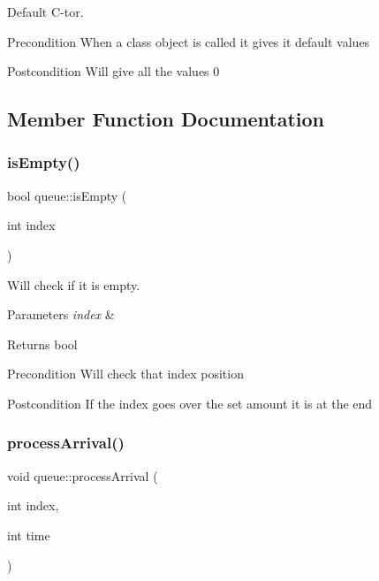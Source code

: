 Default C-\/tor. 

\begin{DoxyPrecond}{Precondition}
When a class object is called it gives it default values 
\end{DoxyPrecond}
\begin{DoxyPostcond}{Postcondition}
Will give all the values 0 
\end{DoxyPostcond}


\subsection{Member Function Documentation}
\mbox{\label{classqueue_a3e8602b62836e36122d074c52a09b1d1}} 
\subsubsection{\texorpdfstring{is\+Empty()}{isEmpty()}}
{\footnotesize\ttfamily bool queue\+::is\+Empty (\begin{DoxyParamCaption}\item[{int}]{index }\end{DoxyParamCaption})}



Will check if it is empty. 


\begin{DoxyParams}{Parameters}
{\em index} & \\
\hline
\end{DoxyParams}
\begin{DoxyReturn}{Returns}
bool 
\end{DoxyReturn}
\begin{DoxyPrecond}{Precondition}
Will check that index position 
\end{DoxyPrecond}
\begin{DoxyPostcond}{Postcondition}
If the index goes over the set amount it is at the end 
\end{DoxyPostcond}
\mbox{\label{classqueue_ad57a0212e99a26f1c4a06600fe2961ff}} 
\subsubsection{\texorpdfstring{process\+Arrival()}{processArrival()}}
{\footnotesize\ttfamily void queue\+::process\+Arrival (\begin{DoxyParamCaption}\item[{int}]{index,  }\item[{int}]{time }\end{DoxyParamCaption})}



